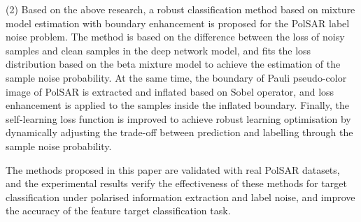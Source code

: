 \begin{englishabstract}
    (2) Based on the above research, a robust classification method based on mixture model estimation with boundary enhancement is proposed for the PolSAR label noise problem. The method is based on the difference between the loss of noisy samples and clean samples in the deep network model, and fits the loss distribution based on the beta mixture model to achieve the estimation of the sample noise probability. At the same time, the boundary of Pauli pseudo-color image of PolSAR is extracted and inflated based on Sobel operator, and loss enhancement is applied to the samples inside the inflated boundary. Finally, the self-learning loss function is improved to achieve robust learning optimisation by dynamically adjusting the trade-off between prediction and labelling through the sample noise probability.

    The methods proposed in this paper are validated with real PolSAR datasets, and the experimental results verify the effectiveness of these methods for target classification under polarised information extraction and label noise, and improve the accuracy of the feature target classification task.

\end{englishabstract}


